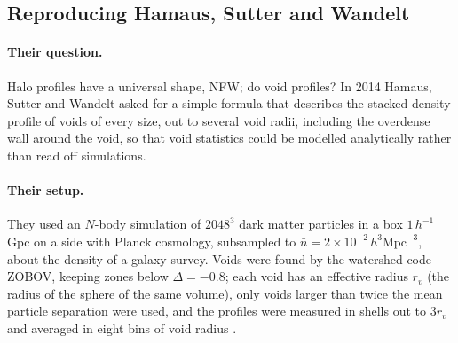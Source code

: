\subsection{Reproducing Hamaus, Sutter and Wandelt}
\label{11b:sec:hamaus}

\paragraph{Their question.}
Halo profiles have a universal shape, NFW; do void profiles? In 2014 Hamaus,
Sutter and Wandelt \cite{Hamaus2014} asked for a simple formula that describes the
stacked density profile of voids of every size, out to several void radii,
including the overdense wall around the void, so that void statistics could be
modelled analytically rather than read off simulations.

\paragraph{Their setup.}
They used an $N$-body simulation of $2048^3$ dark matter particles in a box
$1\,h^{-1}$Gpc on a side with Planck cosmology, subsampled to
$\bar n=2\times10^{-2}\,h^3\mathrm{Mpc}^{-3}$, about the density of a galaxy
survey. Voids were found by the watershed code ZOBOV, keeping zones below
$\Delta=-0.8$; each void has an effective radius $r_v$ (the radius of the sphere
of the same volume), only voids larger than twice the mean particle separation were
used, and the profiles were measured in shells out to $3r_v$ and averaged in eight
bins of void radius .

